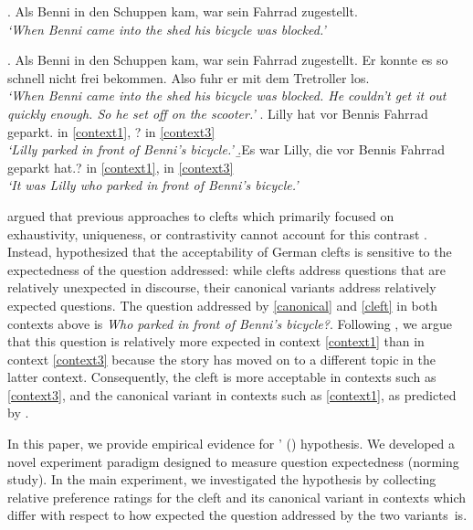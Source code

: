 \documentclass{salt}
\begin{document}
\ex. Als Benni in den Schuppen kam, war sein Fahrrad zugestellt.\\\textit{`When Benni came into the shed his bicycle was blocked.'}\label{context1} 

 \ex. Als Benni in den Schuppen kam, war sein Fahrrad zugestellt. Er konnte es so schnell nicht frei bekommen. Also fuhr er mit dem Tretroller los. \\\textit{`When Benni came into the shed his bicycle was blocked. He couldn't get it out quickly enough. So he set off on the scooter.'}\label{context3} 
 \a.\label{canonical} Lilly hat vor Bennis Fahrrad geparkt.\hfill \checkmark\hspace{0.1em} in \ref{context1}, ? in \ref{context3}\\
\textit{`Lilly parked in front of Benni's bicycle.'}
\b.\label{cleft}Es war Lilly, die vor Bennis Fahrrad geparkt hat.\hfill? in \ref{context1}, \checkmark\hspace{0.1em} in \ref{context3}\\
\textit{`It was Lilly who parked in front of Benni's bicycle.'}

\cite{tonnis_2021} argued that previous approaches to clefts which primarily focused on exhaustivity, uniqueness, or contrastivity cannot account for this contrast \cite[e.g.,][]{prince_1978,horn_1981,rochemont_1986,velleman_et_al_2012}. Instead, \cite{tonnis_2021} hypothesized that the acceptability of German clefts is sensitive to the expectedness of the question addressed: while clefts address questions that are relatively unexpected in discourse, their canonical variants address relatively expected questions. The question addressed by \ref{canonical} and \ref{cleft} in both contexts above is \textit{Who parked in front of Benni's bicycle?}. Following \cite{tonnis_2021}, we argue that this question is relatively more expected in context \ref{context1} than in context \ref{context3} because the story has moved on to a different topic in the latter context. Consequently, the cleft is more acceptable in contexts such as \ref{context3}, and the canonical variant in contexts such as \ref{context1}, as predicted by \cite{tonnis_2021}.

In this paper, we provide empirical evidence for \citeauthor{tonnis_2021}' (\citeyear{tonnis_2021}) hypothesis. We developed a novel experiment paradigm designed to measure question expectedness (norming study). In the main experiment, we investigated the hypothesis by collecting relative preference ratings for the cleft and its canonical variant in contexts which differ with respect to how expected the question addressed by the two variants~is.
\end{document}
